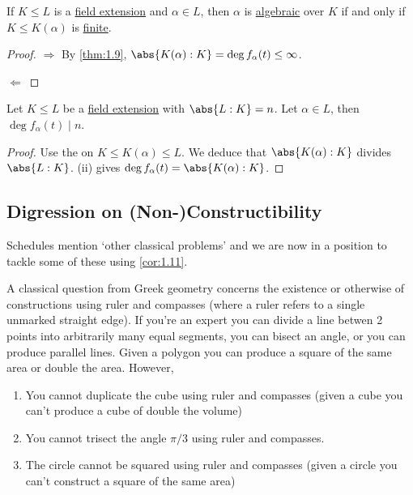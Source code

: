 \documentclass{article}
\begin{document}
\begin{ncor}\label{cor:1.10}
    If $K \leq L$ is a \hyperlink{def:fieldExt}{field extension} and $\alpha \in L$, then $\alpha$ is \hyperlink{def:algebraic}{algebraic} over $K$ if and only if $K \leq K(\alpha)$ is \hyperlink{def:degreeOfFieldExt}{finite}.
\end{ncor}

\begin{proof}
    $\Rightarrow$ By \cref{thm:1.9}, $\abs{K(\alpha):K} = \deg f_\alpha(t) \leq \infty$.

    $\Leftarrow$ 
\end{proof}

\begin{ncor}\label{cor:1.11}
    Let $K \leq L$ be a \hyperlink{def:fieldExt}{field extension} with \hyperlink{def:degreeOfFieldExt}{$\abs{L:K} = n$}. Let $\alpha \in L$, then $\deg f_\alpha(t) \mid n$.
\end{ncor}

\begin{proof}
    Use the  on $K \leq K(\alpha) \leq L$.  We deduce that $\abs{K(\alpha):K}$ divides $\abs{L:K}$.  (ii) gives $\deg f_\alpha(t) = \abs{K(\alpha) : K}$.
\end{proof}

\subsection{Digression on (Non-)Constructibility}
Schedules mention `other classical problems' and we are now in a position to tackle some of these using \cref{cor:1.11}.

A classical question from Greek geometry concerns the existence or otherwise of constructions using ruler and compasses (where a ruler refers to a single unmarked straight edge).
If you're an expert you can divide a line betwen 2 points into arbitrarily many equal segments, you can bisect an angle, or you can produce parallel lines.
Given a polygon you can produce a square of the same area or double the area. However,
\begin{enumerate}
    \item You cannot duplicate the cube using ruler and compasses (given a cube you can't produce a cube of double the volume)
    \item You cannot trisect the angle $\pi/3$ using ruler and compasses.
    \item The circle cannot be squared using ruler and compasses (given a circle you can't construct a square of the same area)
\end{enumerate}
\end{document}
